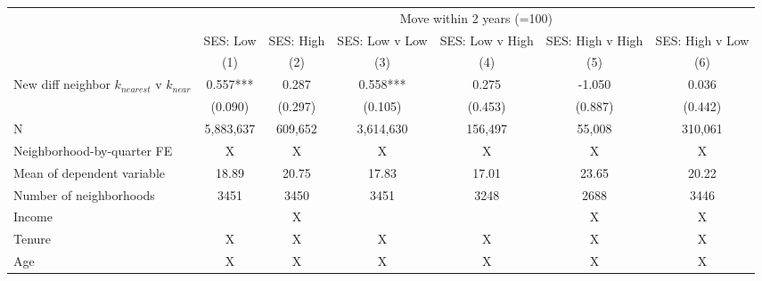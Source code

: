 \begin{tabular}{lcccccc}
\toprule
 & \multicolumn{6}{c}{Move within 2 years (=100)} \\ 
\cmidrule(lr){2-7}
 & SES: Low & SES: High & SES: Low v Low & SES: Low v High & SES: High v High & SES: High v Low \\ 
\cmidrule(lr){2-2} \cmidrule(lr){3-3} \cmidrule(lr){4-4} \cmidrule(lr){5-5} \cmidrule(lr){6-6} \cmidrule(lr){7-7}
  & (1) & (2) & (3) & (4) & (5) & (6) \\ 
\midrule
New diff neighbor $k_{nearest}$ v $k_{near}$ & 0.557*** & 0.287 & 0.558*** & 0.275 & -1.050 & 0.036 \\ 
 & (0.090) & (0.297) & (0.105) & (0.453) & (0.887) & (0.442) \\ 
\midrule
N & 5,883,637 & 609,652 & 3,614,630 & 156,497 & 55,008 & 310,061 \\ 
Neighborhood-by-quarter FE & X & X & X & X & X & X \\ 
Mean of dependent variable & 18.89 & 20.75 & 17.83 & 17.01 & 23.65 & 20.22 \\ 
Number of neighborhoods & 3451 & 3450 & 3451 & 3248 & 2688 & 3446 \\ 
Income &  & X &  &  & X & X \\ 
Tenure & X & X & X & X & X & X \\ 
Age & X & X & X & X & X & X \\ 
\bottomrule
\end{tabular}